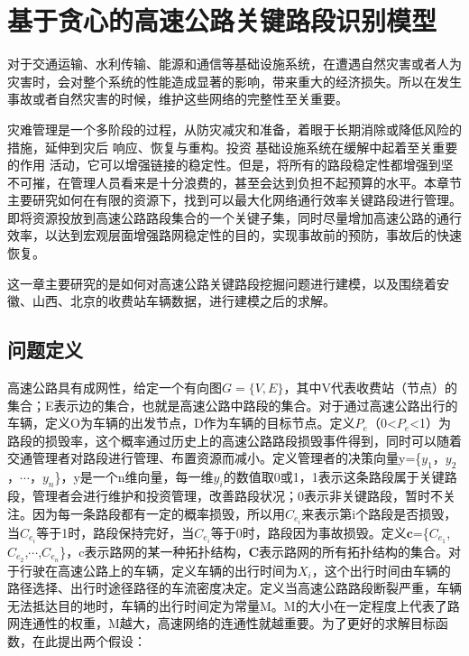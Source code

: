 
\chapter{基于贪心的高速公路关键路段识别模型}
		对于交通运输\parencite{NewmanBasic}、水利传输\parencite{test}、能源和通信等基础设施系统，在遭遇自然灾害或者人为灾害时，会对整个系统的性能造成显著的影响，带来重大的经济损失。所以在发生事故或者自然灾害的时候，维护这些网络的完整性至关重要。

		灾难管理是一个多阶段的过程，从防灾减灾和准备，着眼于长期消除或降低风险的措施，延伸到灾后 响应、恢复与重构。投资 基础设施系统在缓解中起着至关重要的作用 活动，它可以增强链接的稳定性。但是，将所有的路段稳定性都增强到坚不可摧，在管理人员看来是十分浪费的，甚至会达到负担不起预算的水平。本章节主要研究如何在有限的资源下，找到可以最大化网络通行效率关键路段进行管理。即将资源投放到高速公路路段集合的一个关键子集，同时尽量增加高速公路的通行效率，以达到宏观层面增强路网稳定性的目的，实现事故前的预防，事故后的快速恢复。

		这一章主要研究的是如何对高速公路关键路段挖掘问题进行建模，以及围绕着安徽、山西、北京的收费站车辆数据，进行建模之后的求解。

		\section{问题定义}
			高速公路具有成网性，给定一个有向图$G=\{V,E\}$，其中V代表收费站（节点）的集合；E表示边的集合，也就是高速公路中路段的集合。对于通过高速公路出行的车辆，定义O为车辆的出发节点，D作为车辆的目标节点。定义$P_e$（0<$P_e$<1）为路段的损毁率，这个概率通过历史上的高速公路路段损毁事件得到，同时可以随着交通管理者对路段进行管理、布置资源而减小。定义管理者的决策向量y=\{$y_1$，$y_2$，$\cdots$，$y_n$\}，y是一个n维向量，每一维$y_i$的数值取0或1，1表示这条路段属于关键路段，管理者会进行维护和投资管理，改善路段状况；0表示非关键路段，暂时不关注。因为每一条路段都有一定的概率损毁，所以用$C_{e_i}$来表示第i个路段是否损毁，当$C_{e_i}$等于1时，路段保持完好，当$C_{e_i}$等于0时，路段因为事故损毁。定义$\bm{c}$=\{$C_{e_1}$,$C_{e_2}$,$\cdots$,$C_{e_n}$\}，c表示路网的某一种拓扑结构，$\bm{C}$表示路网的所有拓扑结构的集合。对于行驶在高速公路上的车辆，定义车辆的出行时间为$X_i$，这个出行时间由车辆的路径选择、出行时途径路径的车流密度决定。定义当高速公路路段断裂严重，车辆无法抵达目的地时，车辆的出行时间定为常量M。M的大小在一定程度上代表了路网连通性的权重，M越大，高速网络的连通性就越重要。为了更好的求解目标函数，在此提出两个假设：

